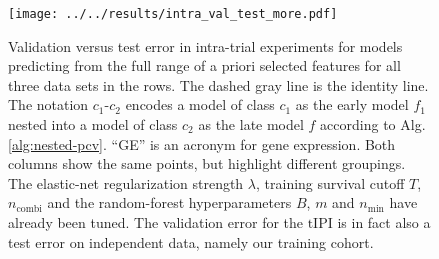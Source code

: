 \begin{figure}
    \centering
    \texttt{[image: ../../results/intra\_val\_test\_more.pdf]}
    \caption{Validation versus test error in intra-trial experiments for models predicting from the 
        full range of a priori selected features for all three data sets in the rows. The dashed 
        gray line is the identity line. The notation 
        $c_1$-$c_2$ encodes a model of class $c_1$ as the early model $f_1$ nested into a model of 
        class $c_2$ as the late model $f$ according to Alg. \ref{alg:nested-pcv}.
        ``GE'' is an acronym for gene expression. Both columns show 
        the same points, but highlight different groupings. The elastic-net 
        regularization strength $\lambda$, training survival cutoff $T$, $n_\text{combi}$ and the 
        random-forest hyperparameters $B$, $m$ and $n_\text{min}$ have already been tuned. The 
        validation error for the $\text{tIPI}$ is in fact also a test error on independent data, 
        namely our training cohort.}
    \label{fig:intra-val-test-more}
\end{figure}